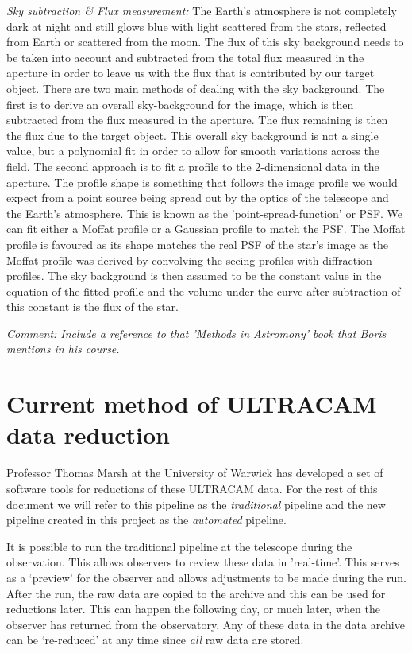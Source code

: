 \emph{Sky subtraction \& Flux measurement:}
The Earth's atmosphere is not completely dark at night and still glows blue with light scattered from the stars, reflected from Earth or scattered from the moon. The flux of this sky background needs to be taken into account and subtracted from the total flux measured in the aperture in order to leave us with the flux that is contributed by our target object. There are two main methods of dealing with the sky background. The first is to derive an overall sky-background for the image, which is then subtracted from the flux measured in the aperture. The flux remaining is then the flux due to the target object. This overall sky background is not a single value, but a polynomial fit in order to allow for smooth variations across the field. The second approach is to fit a profile to the 2-dimensional data in the aperture. The profile shape is something that follows the image profile we would expect from a point source being spread out by the optics of the telescope and the Earth's atmosphere. This is known as the 'point-spread-function' or {PSF}. We can fit either a Moffat profile or a Gaussian profile to match the PSF. The Moffat profile is favoured as its shape matches the real PSF of the star's image as the Moffat profile was derived by convolving the seeing profiles with diffraction profiles. The sky background is then assumed to be the constant value in the equation of the fitted profile and the volume under the curve after subtraction of this constant is the flux of the star. 

\emph{Comment: Include a reference to that 'Methods in Astromony' book that Boris mentions in his course.}

\section{Current method of ULTRACAM data reduction}

Professor Thomas Marsh at the University of Warwick has developed a set of software tools for reductions of these ULTRACAM data. For the rest of this document we will refer to this pipeline as the \emph{traditional} pipeline and the new pipeline created in this project as the \emph{automated} pipeline. 

It is possible to run the traditional pipeline at the telescope during the observation. This allows observers to review these data in 'real-time'. This serves as a `preview' for the observer and allows adjustments to be made during the run. After the run, the raw data are copied to the archive and this can be used for reductions later. This can happen the following day, or much later, when the observer has returned from the observatory. Any of these data in the  data archive can be `re-reduced' at any time since \emph{all} raw data are stored. 

